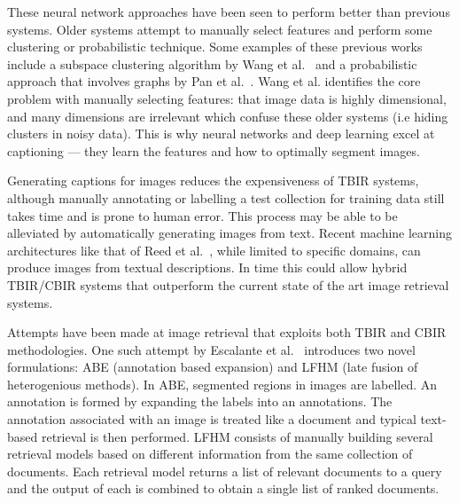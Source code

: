 These neural network approaches have been seen to perform better than previous systems. Older systems attempt to manually select features and perform some clustering or probabilistic technique. Some examples of these previous works include a subspace clustering algorithm by Wang et al.~\cite{wang2004automatic} and a probabilistic approach that involves graphs by Pan et al.~\cite{pan2004gcap}. Wang et al. identifies the core problem with manually selecting features: that image data is highly dimensional, and many dimensions are irrelevant which confuse these older systems (i.e hiding clusters in noisy data). This is why neural networks and deep learning excel at captioning --- they learn the features and how to optimally segment images.

Generating captions for images reduces the expensiveness of TBIR systems, although manually annotating or labelling a test collection for training data still takes time and is prone to human error. This process may be able to be alleviated by automatically generating images from text. Recent machine learning architectures like that of Reed et al.~\cite{reed2016generative}, while limited to specific domains, can produce images from textual descriptions. In time this could allow hybrid TBIR/CBIR systems that outperform the current state of the art image retrieval systems.

Attempts have been made at image retrieval that exploits both TBIR and CBIR methodologies. One such attempt by Escalante et al.~\cite{escalante2007towards} introduces two novel formulations: ABE (annotation based expansion) and LFHM (late fusion of heterogenious methods). In ABE, segmented regions in images are labelled. An annotation is formed by expanding the labels into an annotations. The annotation associated with an image is treated like a document and typical text-based retrieval is then performed. LFHM consists of manually building several retrieval models based on different information from the same collection of documents. Each retrieval model returns a list of relevant documents to a query and the output of each is combined to obtain a single list of ranked documents.

